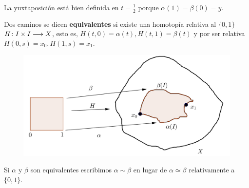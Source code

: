 \documentclass[GTS.tex]{subfiles}
\begin{document}
\begin{nota} La yuxtaposición está bien definida en $t=\frac{1}{2}$ porque $\alpha(1)=\beta(0)=y$.
\end{nota}
\begin{defi} Dos caminos se dicen \textbf{equivalentes} si existe una homotopía relativa al $\{0,1\}$ $H\colon{I\times I}\longrightarrow{X}$, esto es,  $H(t,0)=\alpha(t),H(t,1)=\beta(t)$ y por ser relativa $H(0,s)=x_0, H(1,s)=x_1$.
\end{defi}
\begin{figure}[h!]
	\centering
	\includegraphics[scale=0.3]{caminoequivalente}
\end{figure}

\begin{nota} Si $\alpha$ y $\beta$ son equivalentes escribimos $\alpha\sim\beta$ en lugar de $\alpha\simeq\beta$ relativamente a $\{0,1\}$.
\end{nota}
\end{document}
